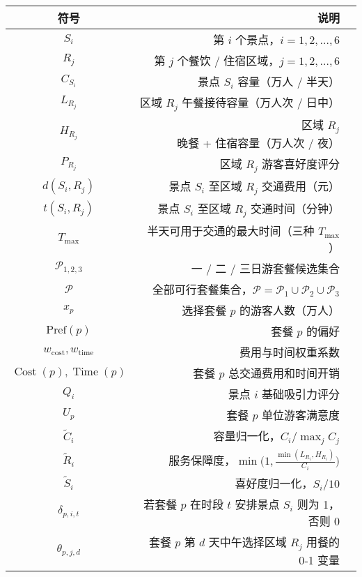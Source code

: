 \begin{table}[htbp]
  \begin{tabularx}{\textwidth}{|C|D|U|}
    \hline
      \textbf{符号} & \textbf{说明}\\
    \hline
    $S_i$ & 第 $i$ 个景点，$i = 1,2,\dots,6$ \\
    $R_j$ & 第 $j$ 个餐饮 / 住宿区域，$j = 1,2,\dots,6$ \\
    $C_{S_i}$ & 景点 $S_i$ 容量（万人 / 半天） \\
    $L_{R_j}$ & 区域 $R_j$ 午餐接待容量（万人次 / 日中） \\
    $H_{R_j}$ & 区域 $R_j$ 晚餐 + 住宿容量（万人次 / 夜） \\
    $P_{R_j}$ & 区域 $R_j$ 游客喜好度评分 \\
    $d(S_i,R_j)$ & 景点 $S_i$ 至区域 $R_j$ 交通费用（元） \\
    $t(S_i,R_j)$ & 景点 $S_i$ 至区域 $R_j$ 交通时间（分钟） \\
    $T_{\max}$   & 半天可用于交通的最大时间（三种 $T_{\max}$） \\
    $\mathcal P_{1,2,3}$ & 一 / 二 / 三日游套餐候选集合 \\
    $\mathcal P$ & 全部可行套餐集合，$\mathcal P=\mathcal P_1\cup\mathcal P_2\cup\mathcal P_3$ \\
    $x_p$ & 选择套餐 $p$ 的游客人数（万人） \\
    $\text{Pref}(p)$ & 套餐 $p$ 的偏好 \\
    $w_{\text{cost}}, w_{\text{time}}$ & 费用与时间权重系数 \\
    $\operatorname{Cost}(p),\operatorname{Time}(p)$ & 套餐 $p$ 总交通费用和时间开销 \\
    $Q_i$ & 景点 $i$ 基础吸引力评分 \\
    $U_p$ & 套餐 $p$ 单位游客满意度 \\
    $\tilde C_i$ & 容量归一化，$C_i/\max_j C_j$ \\
    $\tilde R_i$ & 服务保障度，$\min\!\bigl(1,\frac{\min(L_{R_i},H_{R_i})}{C_i}\bigr)$ \\
    $\tilde S_i$ & 喜好度归一化，$S_i/10$ \\
    $\delta_{p,i,t}$ & 若套餐 $p$ 在时段 $t$ 安排景点 $S_i$ 则为 1，否则 0 \\
    $\theta_{p,j,d}$ & 套餐 $p$ 第 $d$ 天中午选择区域 $R_j$ 用餐的 0‑1 变量 \\

\end{tabularx}
\end{table}

